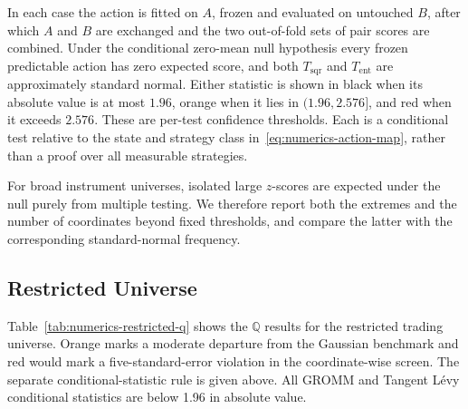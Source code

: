 \documentclass[11pt]{article}
\newcommand{\Q}{\mathbb Q}
\theoremstyle{plain}
\theoremstyle{definition}
\theoremstyle{remark}
\begin{document}
In each case the action is fitted on $A$, frozen and evaluated on untouched
$B$, after which $A$ and $B$ are exchanged and the two out-of-fold sets of
pair scores are combined.  Under the conditional zero-mean null hypothesis
every frozen predictable action has zero expected score, and both
$T_{\mathrm{sqr}}$ and $T_{\mathrm{ent}}$ are approximately standard normal.
Either statistic is shown in black when its absolute value is at most $1.96$,
orange when it lies in $(1.96,2.576]$, and red when it exceeds $2.576$.
These are per-test confidence thresholds.  Each is a conditional test relative
to the state and strategy class in~\eqref{eq:numerics-action-map}, rather than
a proof over all measurable strategies.

For broad instrument universes, isolated large $z$-scores are expected under
the null purely from multiple testing.  We therefore report both the extremes
and the number of coordinates beyond fixed thresholds, and compare the latter
with the corresponding standard-normal frequency.

\subsection{Restricted Universe}



Table~\ref{tab:numerics-restricted-q} shows the $\Q$ results for the restricted
trading universe.  Orange marks a moderate departure from the Gaussian
benchmark and red would mark a five-standard-error violation in the
coordinate-wise screen.  The separate conditional-statistic rule is given
above. All GROMM and Tangent L\'evy conditional statistics are below 1.96 in absolute value.
\end{document}
